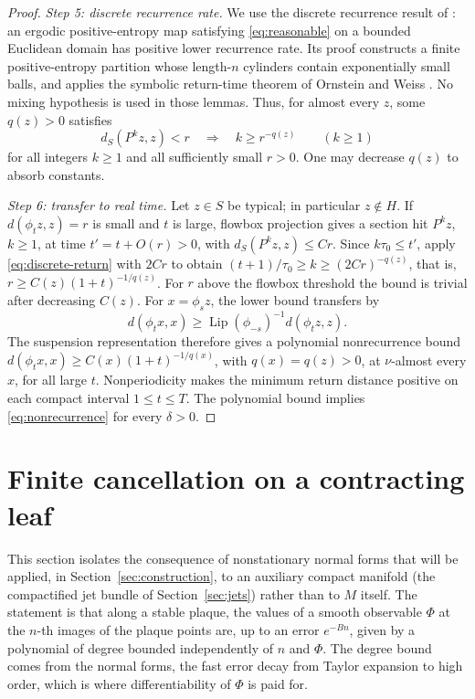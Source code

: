 \documentclass[12pt]{article}
\theoremstyle{remark}
\newcommand{\Lip}{\operatorname{Lip}}
\begin{document}
\begin{proof}
\emph{Step 5: discrete recurrence rate.}
We use the discrete recurrence result of
\cite[Section~3, Definition 13 and Lemmas 12, 14; numbering of the
arXiv version]{Saussol2004}:
an ergodic positive-entropy map satisfying
\eqref{eq:reasonable} on a bounded Euclidean domain has positive
lower recurrence rate.  Its proof constructs a finite
positive-entropy partition whose length-\(n\) cylinders contain
exponentially small balls, and applies the symbolic return-time
theorem of Ornstein and Weiss \cite{OrnsteinWeiss1993}.
No mixing hypothesis is used in those lemmas.
Thus, for almost every \(z\), some \(q(z)>0\) satisfies
\begin{equation}\label{eq:discrete-return}
 d_S(P^kz,z)<r\quad\Longrightarrow\quad k\ge r^{-q(z)}
 \qquad(k\ge1)
\end{equation}
for all integers \(k\ge1\) and all sufficiently small \(r>0\).
One may decrease \(q(z)\) to absorb constants.

\emph{Step 6: transfer to real time.}
Let \(z\in S\) be typical; in particular \(z\notin H\).
If \(d(\phi_tz,z)=r\) is small and \(t\) is large, flowbox projection
gives a section hit \(P^kz\), \(k\ge1\), at time \(t'=t+O(r)>0\),
with \(d_S(P^kz,z)\le Cr\).
Since \(k\tau_0\le t'\), apply \eqref{eq:discrete-return} with \(2Cr\)
to obtain \((t+1)/\tau_0\ge k\ge(2Cr)^{-q(z)}\), that is,
\(r\ge C(z)(1+t)^{-1/q(z)}\).
For \(r\) above the flowbox threshold the bound is trivial after
decreasing \(C(z)\).
For \(x=\phi_sz\), the lower bound transfers by
\[
 d(\phi_tx,x)\ge
       \Lip(\phi_{-s})^{-1}d(\phi_tz,z).
\]
The suspension representation therefore gives a polynomial
nonrecurrence bound \(d(\phi_tx,x)\ge C(x)(1+t)^{-1/q(x)}\), with
\(q(x)=q(z)>0\), at \(\nu\)-almost every \(x\), for all large \(t\).
Nonperiodicity makes the minimum return distance positive on each
compact interval \(1\le t\le T\).  The polynomial bound implies
\eqref{eq:nonrecurrence} for every \(\delta>0\).
\end{proof}

\section{Finite cancellation on a contracting leaf}
\label{sec:cancellation}

This section isolates the consequence of nonstationary normal forms
that will be applied, in Section~\ref{sec:construction}, to an
auxiliary compact manifold (the compactified jet bundle of
Section~\ref{sec:jets}) rather than to \(M\) itself.
The statement is that along a stable plaque, the
values of a smooth observable \(\Phi\) at the \(n\)-th images of the
plaque points are, up to an error \(e^{-Bn}\), given by a polynomial
of degree bounded independently of \(n\) and \(\Phi\).  The degree
bound comes from the normal forms, the fast error decay from Taylor
expansion to high order, which is where differentiability of
\(\Phi\) is paid for.
\end{document}
